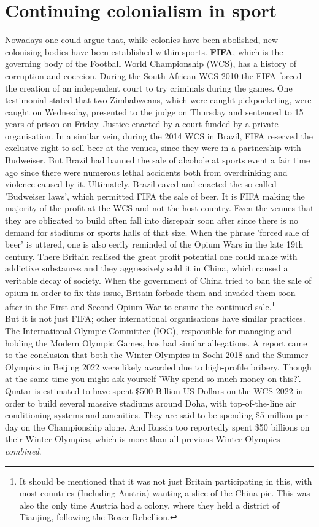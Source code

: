 \documentclass{article}
\begin{document}
	\section{Continuing colonialism in sport}
	Nowadays one could argue that, while colonies have been abolished, new colonising bodies have been established within sports. \textbf{FIFA}, which is the governing body of the Football World Championship (WCS), has a history of corruption and coercion. During the South African WCS 2010 the FIFA forced the creation of an independent court to try criminals during the games. One testimonial stated that two Zimbabweans, which were caught pickpocketing, were caught on Wednesday, presented to the judge on Thursday and sentenced to 15 years of prison on Friday. Justice enacted by a court funded by a private organisation. In a similar vein, during the 2014 WCS in Brazil, FIFA reserved the exclusive right to sell beer at the venues, since they were in a partnership with Budweiser. But Brazil had banned the sale of alcohole at sports event a fair time ago since there were numerous lethal accidents both from overdrinking and violence caused by it. Ultimately, Brazil caved and enacted the so called 'Budweiser laws', which permitted FIFA the sale of beer. It is FIFA making the majority of the profit at the WCS and not the host country. Even the venues that they are obligated to build often fall into disrepair soon after since there is no demand for stadiums or sports halls of that size. When the phrase 'forced sale of beer' is uttered, one is also eerily reminded of the Opium Wars in the late 19th century. There Britain realised the great profit potential one could make with addictive substances and they aggressively sold it in China, which caused a veritable decay of society. When the government of China tried to ban the sale of opium in order to fix this issue, Britain forbade them and invaded them soon after in the First and Second Opium War to ensure the continued sale.\footnote{It should be mentioned that it was not just Britain participating in this, with most countries (Including Austria) wanting a slice of the China pie. This was also the only time Austria had a colony, where they held a district of Tianjing, following the Boxer Rebellion.} \\
	But it is not just FIFA; other international organisations have similar practices. The International Olympic Committee (IOC), responsible for managing and holding the Modern Olympic Games, has had similar allegations. A report came to the conclusion that both the Winter Olympics in Sochi 2018 and the Summer Olympics in Beijing 2022 were likely awarded due to high-profile bribery. Though at the same time you might ask yourself 'Why spend so much money on this?'. Quatar is estimated to have spent \$500 Billion US-Dollars on the WCS 2022 in order to build several massive stadiums around Doha, with top-of-the-line air conditioning systems and amenities. They are said to be spending \$5 million per day on the Championship alone. And Russia too reportedly spent \$50 billions on their Winter Olympics, which is more than all previous Winter Olympics \textit{combined}. \\
\end{document}
